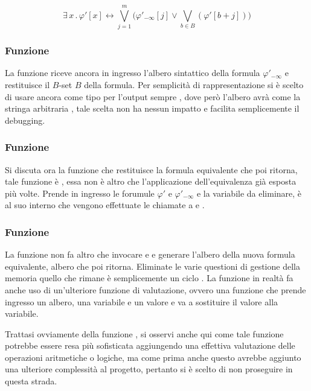 \documentclass[11pt,letterpaper,twoside]{article}
\begin{document}
$$ \exists \, x \, . \, \varphi'[x] \longleftrightarrow \bigvee_{j=1}^m \Big(
\varphi'_{- \infty}[j] \lor \bigvee_{b \in B}(\varphi'[b+j]) \Big)$$

\subsubsection{Funzione } 

La funzione 
riceve ancora in ingresso l'albero sintattico della formula $\varphi'_{-
\infty}$ e restituisce il $B$-set $B$ della formula. Per semplicità di
rappresentazione si è scelto di usare ancora come tipo per l'output sempre
, dove però l'albero avrà come  la
stringa arbitraria , tale scelta non ha nessun impatto e
facilita semplicemente il debugging.

\subsubsection{Funzione } 

Si discuta ora la funzione che restituisce la formula equivalente che poi
 ritorna, tale funzione è , essa non è altro
che l'applicazione dell'equivalenza già esposta più volte. Prende in ingresso le
forumule $\varphi'$ e $\varphi'_{-\infty}$ e la variabile da eliminare, è al suo
interno che vengono effettuate le chiamate a  e
.

\subsubsection{Funzione } 

La funzione  non fa altro che invocare  e
 e generare l'albero della nuova formula equivalente,
albero che poi ritorna. Eliminate le varie questioni di gestione della memoria
quello che rimane è semplicemente un ciclo . La funzione in realtà
fa anche uso di un'ulteriore funzione di valutazione, ovvero una funzione che
prende ingresso un albero, una variabile e un valore e va a sostituire il valore
alla variabile.

Trattasi ovviamente della funzione , si osservi anche qui come tale funzione
potrebbe essere resa più sofisticata aggiungendo una effettiva valutazione delle
operazioni aritmetiche o logiche, ma come prima anche questo avrebbe aggiunto
una ulteriore complessità al progetto, pertanto si è scelto di non proseguire in
questa strada.
\end{document}
